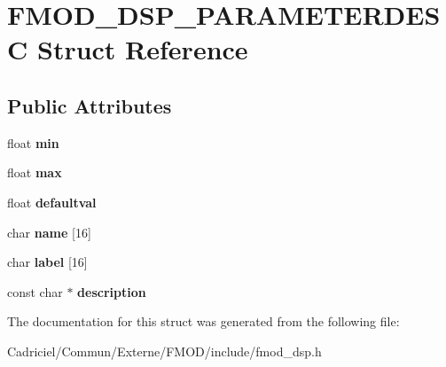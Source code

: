 \hypertarget{struct_f_m_o_d___d_s_p___p_a_r_a_m_e_t_e_r_d_e_s_c}{\section{F\-M\-O\-D\-\_\-\-D\-S\-P\-\_\-\-P\-A\-R\-A\-M\-E\-T\-E\-R\-D\-E\-S\-C Struct Reference}
\label{struct_f_m_o_d___d_s_p___p_a_r_a_m_e_t_e_r_d_e_s_c}
}
\subsection*{Public Attributes}
\begin{DoxyCompactItemize}
\item 
\hypertarget{struct_f_m_o_d___d_s_p___p_a_r_a_m_e_t_e_r_d_e_s_c_a6a70d0988ed0a13192f2d2beb2bd5595}{float {\bfseries min}}\label{struct_f_m_o_d___d_s_p___p_a_r_a_m_e_t_e_r_d_e_s_c_a6a70d0988ed0a13192f2d2beb2bd5595}

\item 
\hypertarget{struct_f_m_o_d___d_s_p___p_a_r_a_m_e_t_e_r_d_e_s_c_aabb0d4e04d947e9830378115e3085402}{float {\bfseries max}}\label{struct_f_m_o_d___d_s_p___p_a_r_a_m_e_t_e_r_d_e_s_c_aabb0d4e04d947e9830378115e3085402}

\item 
\hypertarget{struct_f_m_o_d___d_s_p___p_a_r_a_m_e_t_e_r_d_e_s_c_a9f47edb0a65cceaa81dd3cc77a272734}{float {\bfseries defaultval}}\label{struct_f_m_o_d___d_s_p___p_a_r_a_m_e_t_e_r_d_e_s_c_a9f47edb0a65cceaa81dd3cc77a272734}

\item 
\hypertarget{struct_f_m_o_d___d_s_p___p_a_r_a_m_e_t_e_r_d_e_s_c_a1619c32ff0267079429a9fa4c76f5745}{char {\bfseries name} \mbox{[}16\mbox{]}}\label{struct_f_m_o_d___d_s_p___p_a_r_a_m_e_t_e_r_d_e_s_c_a1619c32ff0267079429a9fa4c76f5745}

\item 
\hypertarget{struct_f_m_o_d___d_s_p___p_a_r_a_m_e_t_e_r_d_e_s_c_a989bbcd725bbe64d8ec330be19037d78}{char {\bfseries label} \mbox{[}16\mbox{]}}\label{struct_f_m_o_d___d_s_p___p_a_r_a_m_e_t_e_r_d_e_s_c_a989bbcd725bbe64d8ec330be19037d78}

\item 
\hypertarget{struct_f_m_o_d___d_s_p___p_a_r_a_m_e_t_e_r_d_e_s_c_aff99d44f94a9bcded22e7a24a8976f41}{const char $\ast$ {\bfseries description}}\label{struct_f_m_o_d___d_s_p___p_a_r_a_m_e_t_e_r_d_e_s_c_aff99d44f94a9bcded22e7a24a8976f41}

\end{DoxyCompactItemize}


The documentation for this struct was generated from the following file\-:\begin{DoxyCompactItemize}
\item 
Cadriciel/\-Commun/\-Externe/\-F\-M\-O\-D/include/fmod\-\_\-dsp.\-h\end{DoxyCompactItemize}
